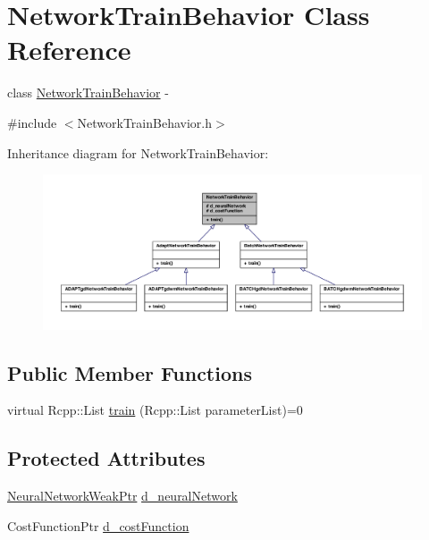 \hypertarget{class_network_train_behavior}{
\section{NetworkTrainBehavior Class Reference}
\label{class_network_train_behavior}
}


class \hyperlink{class_network_train_behavior}{NetworkTrainBehavior} -\/  




{\ttfamily \#include $<$NetworkTrainBehavior.h$>$}



Inheritance diagram for NetworkTrainBehavior:
\nopagebreak
\begin{figure}[H]
\begin{center}
\leavevmode
\includegraphics[width=400pt]{class_network_train_behavior__inherit__graph}
\end{center}
\end{figure}
\subsection*{Public Member Functions}
\begin{DoxyCompactItemize}
\item 
virtual Rcpp::List \hyperlink{class_network_train_behavior_a65ba0e506f2e9555ab4b0529efcbb421}{train} (Rcpp::List parameterList)=0
\end{DoxyCompactItemize}
\subsection*{Protected Attributes}
\begin{DoxyCompactItemize}
\item 
\hyperlink{_a_m_o_r_e_8h_a8d64c996fa6b9b71d7f9d67e229650bf}{NeuralNetworkWeakPtr} \hyperlink{class_network_train_behavior_a8aeb49c74086173b7d1623da8567901d}{d\_\-neuralNetwork}
\item 
CostFunctionPtr \hyperlink{class_network_train_behavior_aa3c0f3bcbfd2d775f93a38a9b67b1793}{d\_\-costFunction}
\end{DoxyCompactItemize}


